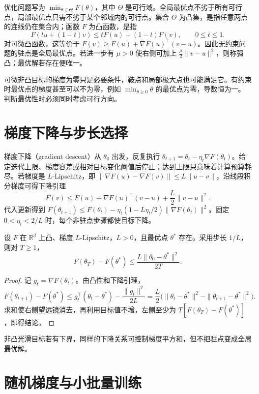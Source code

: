 \documentclass[UTF8,12pt,a4paper,fontset=fandol]{ctexbook}
\begin{document}
优化问题写为 $\min_{\theta\in\Theta}F(\theta)$，其中 $\Theta$ 是可行域。全局最优点不劣于所有可行点，局部最优点只需不劣于某个邻域内的可行点。集合 $\Theta$ 为凸集，是指任意两点的连线仍在集合内；函数 $F$ 为凸函数，是指
\[
 F(tu+(1-t)v)\leq tF(u)+(1-t)F(v),\qquad 0\leq t\leq1.
\]
对可微凸函数，这等价于 $F(v)\geq F(u)+\nabla F(u)^\top(v-u)$。因此无约束问题的驻点是全局最优点。若进一步有 $\mu>0$ 使右侧可加上 $\frac\mu2\|v-u\|^2$，则称强凸；最优解若存在便唯一。

可微非凸目标的梯度为零只是必要条件，鞍点和局部极大点也可能满足它。有约束时最优点的梯度甚至可以不为零，例如 $\min_{\theta\geq0}\theta$ 的最优点为零，导数恒为一。判断最优性时必须同时考虑可行方向。

\section{梯度下降与步长选择}

梯度下降（gradient descent）从 $\theta_0$ 出发，反复执行 $\theta_{t+1}=\theta_t-\eta_t\nabla F(\theta_t)$。给定迭代上限、梯度容差或相对目标变化阈值后停止；达到上限只意味着计算预算耗尽。若梯度是 $L$-Lipschitz，即 $\|\nabla F(u)-\nabla F(v)\|\leq L\|u-v\|$，沿线段积分梯度可得下降引理
\[
 F(v)\leq F(u)+\nabla F(u)^\top(v-u)+\frac L2\|v-u\|^2.
\]
代入更新得到 $F(\theta_{t+1})\leq F(\theta_t)-\eta_t(1-L\eta_t/2)\|\nabla F(\theta_t)\|^2$。固定 $0<\eta_t<2/L$ 时，每个非驻点步骤都使目标下降。

\begin{proposition}[光滑凸目标的梯度下降界]
设 $F$ 在 $\mathbb R^d$ 上凸、梯度 $L$-Lipschitz，$L>0$，且最优点 $\theta^*$ 存在。采用步长 $1/L$，则对 $T\geq1$，
\[
 F(\theta_T)-F(\theta^*)\leq\frac{L\|\theta_0-\theta^*\|^2}{2T}.
\]
\end{proposition}
\begin{proof}
记 $g_t=\nabla F(\theta_t)$。由凸性和下降引理，
\[
 F(\theta_{t+1})-F(\theta^*)\leq
 g_t^\top(\theta_t-\theta^*)-\frac{\|g_t\|^2}{2L}
 =\frac L2\bigl(\|\theta_t-\theta^*\|^2-\|\theta_{t+1}-\theta^*\|^2\bigr).
\]
求和使右侧望远镜消去，再利用目标值不增，左侧至少为 $T[F(\theta_T)-F(\theta^*)]$，即得结论。
\end{proof}

非凸光滑目标若有下界，同样的下降关系可控制梯度平方和，但不把驻点变成全局最优解。

\section{随机梯度与小批量训练}
\end{document}
